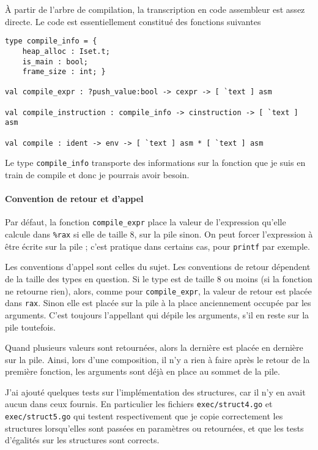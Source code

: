 \documentclass{article}
\begin{document}
À partir de l'arbre de compilation, la transcription en code assembleur est assez directe. Le code est essentiellement constitué des fonctions suivantes

\begin{verbatim}
type compile_info = {
    heap_alloc : Iset.t;
    is_main : bool;
    frame_size : int; }

val compile_expr : ?push_value:bool -> cexpr -> [ `text ] asm

val compile_instruction : compile_info -> cinstruction -> [ `text ] asm

val compile : ident -> env -> [ `text ] asm * [ `text ] asm
\end{verbatim}

Le type \texttt{compile\_info} transporte des informations sur la fonction que je suis en train de compile et donc je pourrais avoir besoin.

\paragraph{Convention de retour et d'appel} Par défaut, la fonction \texttt{compile\_expr} place la valeur de l'expression qu'elle calcule dans \texttt{\%rax} si elle de taille 8, sur la pile sinon. On peut forcer l'expression à être écrite sur la pile ; c'est pratique dans certains cas, pour \texttt{printf} par exemple.

Les conventions d'appel sont celles du sujet. Les conventions de retour dépendent de la taille des types en question. Si le type est de taille 8 ou moins (si la fonction ne retourne rien), alors, comme pour \texttt{compile\_expr}, la valeur de retour est placée dans \texttt{rax}. Sinon elle est placée sur la pile à la place anciennement occupée par les arguments. C'est toujours l'appellant qui dépile les arguments, s'il en reste sur la pile toutefois.

Quand plusieurs valeurs sont retournées, alors la dernière est placée en dernière sur la pile. Ainsi, lors d'une composition, il n'y a rien à faire après le retour de la première fonction, les arguments sont déjà en place au sommet de la pile.

J'ai ajouté quelques tests sur l'implémentation des structures, car il n'y en avait aucun dans ceux fournis. En particulier les fichiers \texttt{exec/struct4.go} et \texttt{exec/struct5.go} qui testent respectivement que je copie correctement les structures lorsqu'elles sont passées en paramètres ou retournées, et que les tests d'égalités sur les structures sont corrects.
\end{document}
